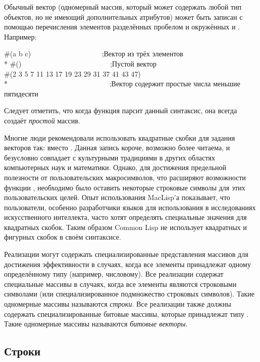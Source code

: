 Обычный вектор (одномерный массив, который может содержать любой тип объектов,
но не имеющий дополнительных атрибутов) может быть записан с помощью
перечисления элементов разделённых пробелом и окружённых \cd{\#(} и
\cd{)}.
Например:
\begin{lisp}
\#(a b c)~~~~~~~~~~~~~~~~~~~~;\textrm{Вектор из трёх элементов} \\*
\#()~~~~~~~~~~~~~~~~~~~~~~~~~;\textrm{Пустой вектор} \\
\#(2 3 5 7 11 13 17 19 23 29 31 37 41 43 47) \\*
~~~~~~~~~~~~~~~~~~~~~~~~~~~~;\textrm{Вектор содержит простые числа меньшие пятидесяти}
\end{lisp}

Следует отметить, что когда функция  парсит данный синтаксис, она
всегда создаёт \emph{простой} массив.

\beforenoterule
\begin{rationale}
Многие люди рекомендовали использовать квадратные скобки для задания векторов
так:  вместо . Данная запись
короче, возможно более читаема, и безусловно совпадает с культурными традициями
в других областях компьютерных наук и математики. Однако, для достижения
предельной полезности от пользовательских макросимволов, что расширяют
возможности функции , необходимо было оставить некоторые строковые
символы для этих пользовательских целей. Опыт использования MacLisp'а
показывает, что пользователи, особенно разработчики языков для использования в
исследованиях искусственного интеллекта, часто хотят определять специальные
значения для квадратных скобок. Таким образом Common Lisp не использует
квадратных и фигурных скобок в своём синтаксисе.
\end{rationale}
\afternoterule

Реализации могут содержать специализированные представления массивов для
достижения эффективности в случаях, когда все элементы принадлежат одному
определённому типу (например, числовому). Все реализации содержат
специальные массивы в случаях, когда все элементы являются строковыми символами
(или специализированное подмножество строковых символов).
Такие одномерные массивы называются \emph{строки}.
Все реализации также должны содержать специализированные битовые массивы,
которые принадлежат типу .
Такие одномерные массивы называются \emph{битовые векторы}.

\subsection{Строки}
\label{STRING-TYPE-SECTION}

